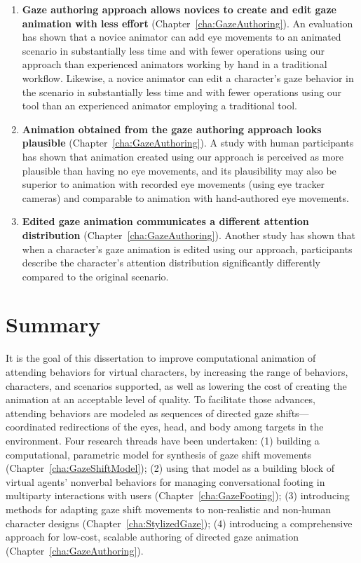 \begin{enumerate}
\item \textbf{Gaze authoring approach allows novices to create and edit gaze animation with less effort} (Chapter~\ref{cha:GazeAuthoring}). An evaluation has shown that a novice animator can add eye movements to an animated scenario in substantially less time and with fewer operations using our approach than experienced animators working by hand in a traditional workflow. Likewise, a novice animator can edit a character's gaze behavior in the scenario in substantially less time and with fewer operations using our tool than an experienced animator employing a traditional tool.
\item \textbf{Animation obtained from the gaze authoring approach looks plausible} (Chapter~\ref{cha:GazeAuthoring}). A study with human participants has shown that animation created using our approach is perceived as more plausible than having no eye movements, and its plausibility may also be superior to animation with recorded eye movements (using eye tracker cameras) and comparable to animation with hand-authored eye movements.
\item \textbf{Edited gaze animation communicates a different attention distribution} (Chapter~\ref{cha:GazeAuthoring}). Another study has shown that when a character's gaze animation is edited using our approach, participants describe the character's attention distribution significantly differently compared to the original scenario.
\end{enumerate}


\section{Summary}

It is the goal of this dissertation to improve computational animation of attending behaviors for virtual characters, by increasing the range of behaviors, characters, and scenarios supported, as well as lowering the cost of creating the animation at an acceptable level of quality. To facilitate those advances, attending behaviors are modeled as sequences of directed gaze shifts---coordinated redirections of the eyes, head, and body among targets in the environment. Four research threads have been undertaken: (1) building a computational, parametric model for synthesis of gaze shift movements (Chapter~\ref{cha:GazeShiftModel}); (2) using that model as a building block of virtual agents' nonverbal behaviors for managing conversational footing in multiparty interactions with users (Chapter~\ref{cha:GazeFooting}); (3) introducing methods for adapting gaze shift movements to non-realistic and non-human character designs (Chapter~\ref{cha:StylizedGaze}); (4) introducing a comprehensive approach for low-cost, scalable authoring of directed gaze animation (Chapter~\ref{cha:GazeAuthoring}).
